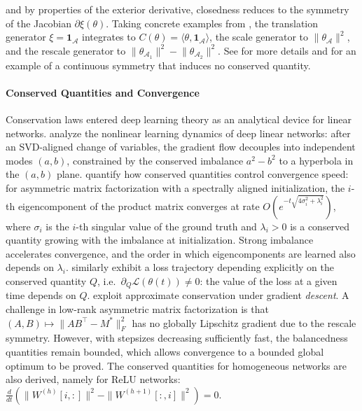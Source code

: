 \documentclass[mathematics,review,submit,moreauthors]{Definitions/mdpi}
\begin{document}
and by properties of the exterior derivative, closedness reduces to the symmetry of the Jacobian $\partial\xi(\theta)$.
Taking concrete examples from \citep{kunin2020}, the translation generator $\xi=\boldsymbol{1}_{\mathcal{A}}$ integrates to $C(\theta)=\langle\theta,\boldsymbol{1}_{\mathcal{A}}\rangle$, the scale generator to $\lVert\theta_{\mathcal{A}}\rVert^2$, and the rescale generator to $\lVert\theta_{\mathcal{A}_1}\rVert^2-\lVert\theta_{\mathcal{A}_2}\rVert^2$.
See \citep{kunin2020,zhao2023a,marcotte2023,ziyin2024a} for more details and \citet[Prop.~52]{gegenfurtner2026} for an example of a continuous symmetry that induces no conserved quantity.

\paragraph{Conserved Quantities and Convergence}
Conservation laws entered deep learning theory as an analytical device for linear networks.
\citet{saxe2014piclr2} analyze the nonlinear learning dynamics of deep linear networks: after an SVD-aligned change of variables, the gradient flow decouples into independent modes $(a,b)$, constrained by the conserved imbalance $a^2-b^2$ to a hyperbola in the $(a,b)$ plane.
\citet{tarmoun2021p3icml} quantify how conserved quantities control convergence speed: for asymmetric matrix factorization with a spectrally aligned initialization, the $i$-th eigencomponent of the product matrix converges at rate $O(e^{-t\sqrt{4\sigma_i^2+\lambda_i^2}})$, where $\sigma_i$ is the $i$-th singular value of the ground truth and $\lambda_i>0$ is a conserved quantity growing with the imbalance at initialization.
Strong imbalance accelerates convergence, and the order in which eigencomponents are learned also depends on $\lambda_i$.
\citet{zhao2023a} similarly exhibit a loss trajectory depending explicitly on the conserved quantity $Q$, i.e.\ $\partial_Q\mathcal{L}(\theta(t))\neq0$: the value of the loss at a given time depends on $Q$.
\citet{du2018anips} exploit approximate conservation under gradient \emph{descent}.
A challenge in low-rank asymmetric matrix factorization is that $(A,B) \mapsto \lVert AB^\top-M^*\rVert_F^2$ has no globally Lipschitz gradient due to the rescale symmetry.
However, with stepsizes decreasing sufficiently fast, the balancedness quantities remain bounded, which allows convergence to a bounded global optimum to be proved.
The conserved quantities for homogeneous networks are also derived, namely for ReLU networks: $\frac{d}{dt} \left( \|W^{(h)}[i, :]\|^2 - \|W^{(h+1)}[:, i]\|^2 \right) = 0$.
\end{document}
